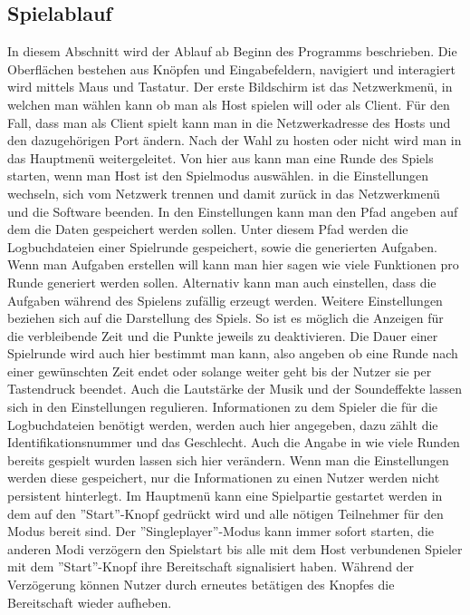 \subsection{Spielablauf}
In diesem Abschnitt wird der Ablauf ab Beginn des Programms beschrieben. Die Oberflächen bestehen aus Knöpfen und Eingabefeldern, navigiert und interagiert wird mittels Maus und Tastatur. Der erste Bildschirm ist das Netzwerkmenü, in welchen man wählen kann ob man als Host spielen will oder als Client. Für den Fall, dass man als Client spielt kann man in die Netzwerkadresse des Hosts und den dazugehörigen Port ändern.\newline
Nach der Wahl zu hosten oder nicht wird man in das Hauptmenü weitergeleitet. Von hier aus kann man eine Runde des Spiels starten, wenn man Host ist den Spielmodus auswählen. in die Einstellungen wechseln, sich vom Netzwerk trennen und damit zurück in das Netzwerkmenü und die Software beenden.\newline
In den Einstellungen kann man den Pfad angeben auf dem die Daten gespeichert werden sollen. Unter diesem Pfad werden die Logbuchdateien einer Spielrunde gespeichert, sowie die generierten Aufgaben. Wenn man Aufgaben erstellen will kann man hier sagen wie viele Funktionen pro Runde generiert werden sollen. Alternativ kann man auch einstellen, dass die Aufgaben während des Spielens zufällig erzeugt werden. Weitere Einstellungen beziehen sich auf die Darstellung des Spiels. So ist es möglich die Anzeigen für die verbleibende Zeit und die Punkte jeweils zu deaktivieren. Die Dauer einer Spielrunde wird auch hier bestimmt man kann, also angeben ob eine Runde nach einer gewünschten Zeit endet oder solange weiter geht bis der Nutzer sie per Tastendruck beendet. Auch die Lautstärke der Musik und der Soundeffekte lassen sich in den Einstellungen regulieren. Informationen zu dem Spieler die für die Logbuchdateien benötigt werden, werden auch hier angegeben, dazu zählt die Identifikationsnummer und das Geschlecht. Auch die Angabe in wie viele Runden bereits gespielt wurden lassen sich hier verändern. Wenn man die Einstellungen werden diese gespeichert, nur die Informationen zu einen Nutzer werden nicht persistent hinterlegt.\newline
Im Hauptmenü kann eine Spielpartie gestartet werden in dem auf den  ''Start''-Knopf gedrückt wird und alle nötigen Teilnehmer für den Modus bereit sind. Der ''Singleplayer''-Modus kann immer sofort starten, die anderen Modi verzögern den Spielstart bis alle mit dem Host verbundenen Spieler mit dem ''Start''-Knopf ihre Bereitschaft signalisiert haben. Während der Verzögerung können Nutzer durch erneutes betätigen des Knopfes die Bereitschaft wieder aufheben.\newline
